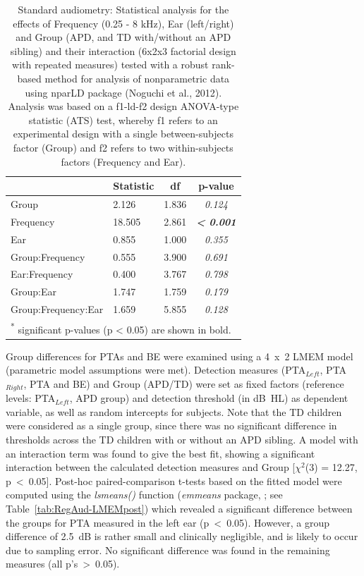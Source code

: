 \documentclass[a4paper, twoside]{templates/ociamthesis}
\begin{document}
\begin{table}

\caption{\label{tab:RegAud-TabnparLD}Standard audiometry: Statistical analysis for the effects of Frequency (0.25 - 8 kHz), Ear (left/right) and Group (APD, and TD with/without an APD sibling) and their interaction (6x2x3 factorial design with repeated measures) tested with a robust rank-based method for analysis of nonparametric data using nparLD package (Noguchi et al., 2012). Analysis was based on a f1-ld-f2 design ANOVA-type statistic (ATS) test, whereby f1 refers to an experimental design with a single between-subjects factor (Group) and f2 refers to two within-subjects factors (Frequency and Ear).}
\centering
\begin{tabular}[t]{llc>{}c}
\toprule
  & Statistic & df & p-value\\
\midrule
Group & 2.126 & 1.836 & \em{0.124}\\
Frequency & 18.505 & 2.861 & \em{\textbf{< 0.001}}\\
Ear & 0.855 & 1.000 & \em{0.355}\\
Group:Frequency & 0.555 & 3.900 & \em{0.691}\\
Ear:Frequency & 0.400 & 3.767 & \em{0.798}\\
Group:Ear & 1.747 & 1.759 & \em{0.179}\\
Group:Frequency:Ear & 1.659 & 5.855 & \em{0.128}\\
\bottomrule
\multicolumn{4}{l}{\textsuperscript{*} significant p-values (p < 0.05) are shown in bold.}\\
\end{tabular}
\end{table}

Group differences for PTAs and BE were examined using a 4~x~2 LMEM model (parametric model assumptions were met). Detection measures (PTA\(_{Left}\), PTA\(_{Right}\), PTA and BE) and Group (APD/TD) were set as fixed factors (reference levels: PTA\(_{Left}\), APD group) and detection threshold (in dB~HL) as dependent variable, as well as random intercepts for subjects. Note that the TD children were considered as a single group, since there was no significant difference in thresholds across the TD children with or without an APD sibling. A model with an interaction term was found to give the best fit, showing a significant interaction between the calculated detection measures and Group {[}\(\chi^2\)(3) = 12.27, p~\textless~0.05{]}. Post-hoc paired-comparison t-tests based on the fitted model were computed using the \emph{lsmeans()} function (\emph{emmeans} package, \textcite{emmeansPackageR}; see Table~\ref{tab:RegAud-LMEMpost}) which revealed a significant difference between the groups for PTA measured in the left ear (p~\textless~0.05). However, a group difference of 2.5~dB is rather small and clinically negligible, and is likely to occur due to sampling error. No significant difference was found in the remaining measures (all p's~\textgreater~0.05).\\
\end{document}
